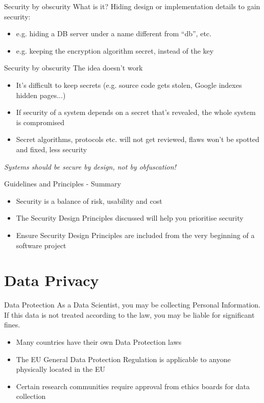 \documentclass{beamer}
\begin{document}
\begin{frame}{Security by obscurity}
What is it? Hiding design or implementation details to gain security:
\begin{itemize}
\item e.g. hiding a DB server under a name different from “db”, etc.
\item e.g. keeping the encryption algorithm secret, instead of the key
\end{itemize}
\end{frame}

\begin{frame}{Security by obscurity}
The idea doesn’t work
\begin{itemize}
\item It’s difficult to keep secrets (e.g. source code gets stolen, Google indexes hidden pages...)
\item If security of a system depends on a secret that's revealed, the whole system is compromised
\item Secret algorithms, protocols etc. will not get reviewed, flaws won’t be spotted and fixed, less security
\end{itemize}
\centering
{ \color{red} \textit{Systems should be secure by design, not by obfuscation!} }
\end{frame}

\begin{frame}{Guidelines and Principles - Summary}
\begin{itemize}
\item Security is a balance of risk, usability and cost
\item The Security Design Principles discussed will help you prioritise security
\item Ensure Security Design Principles are included from the very beginning of a software project
\end{itemize}
\end{frame}

\section{Data Privacy}
\frame{\sectionpage}

\begin{frame}{Data Protection}
As a Data Scientist, you may be collecting Personal Information. If this data is not treated according to the law, you may be liable for significant fines. 
\begin{itemize}
\item Many countries have their own Data Protection laws
\item The EU General Data Protection Regulation is applicable to anyone physically located in the EU
\item Certain research communities require approval from ethics boards for data collection
\end{itemize}
\end{frame}
\end{document}
